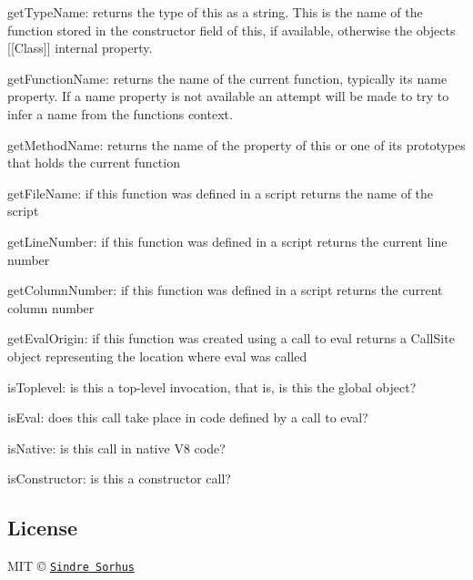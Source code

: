 \begin{DoxyItemize}
\item {\ttfamily get\+Type\+Name}\+: returns the type of this as a string. This is the name of the function stored in the constructor field of this, if available, otherwise the object\textquotesingle{}s \mbox{[}\mbox{[}Class\mbox{]}\mbox{]} internal property.
\item {\ttfamily get\+Function\+Name}\+: returns the name of the current function, typically its name property. If a name property is not available an attempt will be made to try to infer a name from the function\textquotesingle{}s context.
\item {\ttfamily get\+Method\+Name}\+: returns the name of the property of this or one of its prototypes that holds the current function
\item {\ttfamily get\+File\+Name}\+: if this function was defined in a script returns the name of the script
\item {\ttfamily get\+Line\+Number}\+: if this function was defined in a script returns the current line number
\item {\ttfamily get\+Column\+Number}\+: if this function was defined in a script returns the current column number
\item {\ttfamily get\+Eval\+Origin}\+: if this function was created using a call to eval returns a Call\+Site object representing the location where eval was called
\item {\ttfamily is\+Toplevel}\+: is this a top-\/level invocation, that is, is this the global object?
\item {\ttfamily is\+Eval}\+: does this call take place in code defined by a call to eval?
\item {\ttfamily is\+Native}\+: is this call in native V8 code?
\item {\ttfamily is\+Constructor}\+: is this a constructor call?
\end{DoxyItemize}

\subsection*{License}

M\+IT © \href{https://sindresorhus.com}{\tt Sindre Sorhus} 